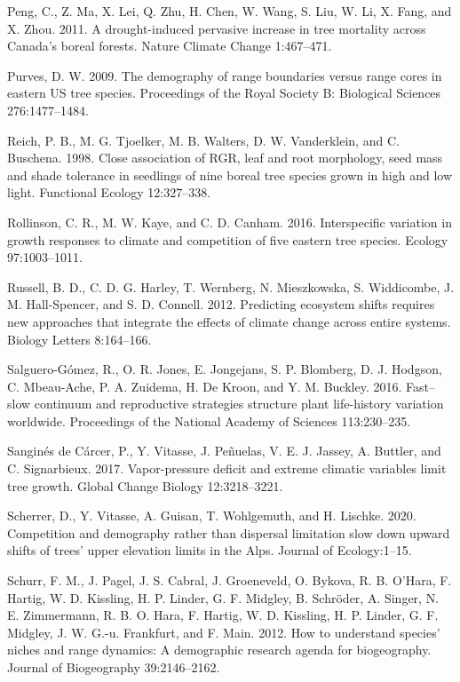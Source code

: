 \documentclass[12pt]{article}
\newlength{\cslhangindent}
\newenvironment{cslreferences}%
  {\setlength{\parindent}{0pt}%
  \everypar{\setlength{\hangindent}{\cslhangindent}}\ignorespaces}%
  {\par}
\begin{document}
\begin{cslreferences}
\leavevmode\hypertarget{ref-Peng2011}{}%
Peng, C., Z. Ma, X. Lei, Q. Zhu, H. Chen, W. Wang, S. Liu, W. Li, X.
Fang, and X. Zhou. 2011. A drought-induced pervasive increase in tree
mortality across Canada's boreal forests. Nature Climate Change
1:467--471.

\leavevmode\hypertarget{ref-Purves2009}{}%
Purves, D. W. 2009. The demography of range boundaries versus range
cores in eastern US tree species. Proceedings of the Royal Society B:
Biological Sciences 276:1477--1484.

\leavevmode\hypertarget{ref-Reich1998}{}%
Reich, P. B., M. G. Tjoelker, M. B. Walters, D. W. Vanderklein, and C.
Buschena. 1998. Close association of RGR, leaf and root morphology, seed
mass and shade tolerance in seedlings of nine boreal tree species grown
in high and low light. Functional Ecology 12:327--338.

\leavevmode\hypertarget{ref-Rollinson2016}{}%
Rollinson, C. R., M. W. Kaye, and C. D. Canham. 2016. Interspecific
variation in growth responses to climate and competition of five eastern
tree species. Ecology 97:1003--1011.

\leavevmode\hypertarget{ref-Russell2012}{}%
Russell, B. D., C. D. G. Harley, T. Wernberg, N. Mieszkowska, S.
Widdicombe, J. M. Hall-Spencer, and S. D. Connell. 2012. Predicting
ecosystem shifts requires new approaches that integrate the effects of
climate change across entire systems. Biology Letters 8:164--166.

\leavevmode\hypertarget{ref-SalgueroGomez2016}{}%
Salguero-Gómez, R., O. R. Jones, E. Jongejans, S. P. Blomberg, D. J.
Hodgson, C. Mbeau-Ache, P. A. Zuidema, H. De Kroon, and Y. M. Buckley.
2016. Fast--slow continuum and reproductive strategies structure plant
life-history variation worldwide. Proceedings of the National Academy of
Sciences 113:230--235.

\leavevmode\hypertarget{ref-Sangines2017}{}%
Sanginés de Cárcer, P., Y. Vitasse, J. Peñuelas, V. E. J. Jassey, A.
Buttler, and C. Signarbieux. 2017. Vapor-pressure deficit and extreme
climatic variables limit tree growth. Global Change Biology
12:3218--3221.

\leavevmode\hypertarget{ref-Scherrer2020}{}%
Scherrer, D., Y. Vitasse, A. Guisan, T. Wohlgemuth, and H. Lischke.
2020. Competition and demography rather than dispersal limitation slow
down upward shifts of trees' upper elevation limits in the Alps. Journal
of Ecology:1--15.

\leavevmode\hypertarget{ref-Schurr2012}{}%
Schurr, F. M., J. Pagel, J. S. Cabral, J. Groeneveld, O. Bykova, R. B.
O'Hara, F. Hartig, W. D. Kissling, H. P. Linder, G. F. Midgley, B.
Schröder, A. Singer, N. E. Zimmermann, R. B. O. Hara, F. Hartig, W. D.
Kissling, H. P. Linder, G. F. Midgley, J. W. G.-u. Frankfurt, and F.
Main. 2012. How to understand species' niches and range dynamics: A
demographic research agenda for biogeography. Journal of Biogeography
39:2146--2162.


\end{cslreferences}
\end{document}
